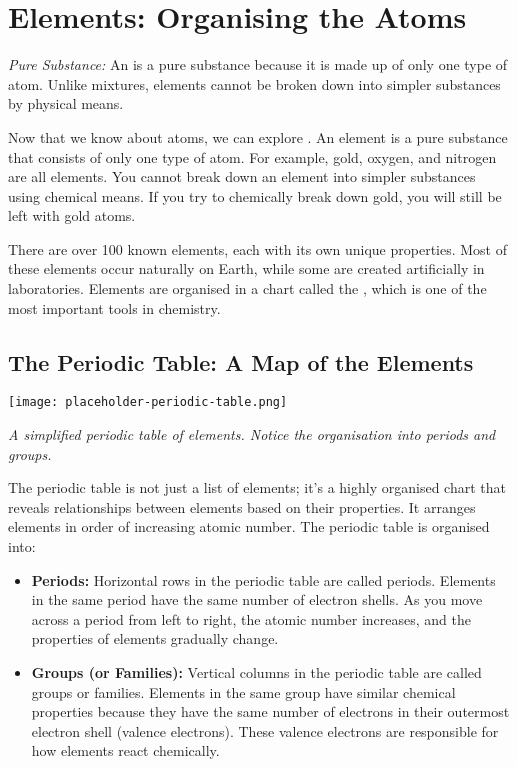\section{Elements: Organising the Atoms}

\begin{marginnote}
\textit{Pure Substance:} An  is a pure substance because it is made up of only one type of atom.  Unlike mixtures, elements cannot be broken down into simpler substances by physical means.
\end{marginnote}

Now that we know about atoms, we can explore . An element is a pure substance that consists of only one type of atom.  For example, gold, oxygen, and nitrogen are all elements.  You cannot break down an element into simpler substances using chemical means. If you try to chemically break down gold, you will still be left with gold atoms.

There are over 100 known elements, each with its own unique properties.  Most of these elements occur naturally on Earth, while some are created artificially in laboratories.  Elements are organised in a chart called the , which is one of the most important tools in chemistry.

\subsection{The Periodic Table: A Map of the Elements}

\begin{marginfigure}
\texttt{[image: placeholder-periodic-table.png]}
\caption*{\textit{A simplified periodic table of elements.  Notice the organisation into periods and groups.}}
\end{marginfigure}

The periodic table is not just a list of elements; it’s a highly organised chart that reveals relationships between elements based on their properties.  It arranges elements in order of increasing atomic number.  The periodic table is organised into:

\begin{itemize}
    \item \textbf{Periods:}  Horizontal rows in the periodic table are called periods.  Elements in the same period have the same number of electron shells.  As you move across a period from left to right, the atomic number increases, and the properties of elements gradually change.
    \item \textbf{Groups (or Families):} Vertical columns in the periodic table are called groups or families. Elements in the same group have similar chemical properties because they have the same number of electrons in their outermost electron shell (valence electrons).  These valence electrons are responsible for how elements react chemically.
\end{itemize}

